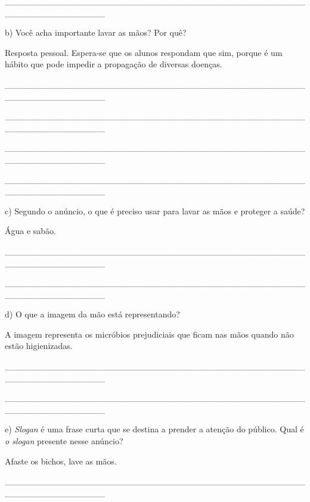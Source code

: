 \begin{boxlist}
{\_\_\_\_\_\_\_\_\_\_\_\_\_\_\_\_\_\_\_\_\_\_\_\_\_\_\_\_\_\_\_\_\_\_\_\_\_\_\_\_\_\_\_\_\_\_\_\_\_\_\_\_\_\_\_\_\_\_\_\_\_\_\_\_

b) Você acha importante lavar as mãos? Por quê?

Resposta pessoal. Espera-se que os alunos respondam que sim, porque é um
hábito que pode impedir a propagação de diversas doenças.

\_\_\_\_\_\_\_\_\_\_\_\_\_\_\_\_\_\_\_\_\_\_\_\_\_\_\_\_\_\_\_\_\_\_\_\_\_\_\_\_\_\_\_\_\_\_\_\_\_\_\_\_\_\_\_\_\_\_\_\_\_\_\_\_

\_\_\_\_\_\_\_\_\_\_\_\_\_\_\_\_\_\_\_\_\_\_\_\_\_\_\_\_\_\_\_\_\_\_\_\_\_\_\_\_\_\_\_\_\_\_\_\_\_\_\_\_\_\_\_\_\_\_\_\_\_\_\_\_

\_\_\_\_\_\_\_\_\_\_\_\_\_\_\_\_\_\_\_\_\_\_\_\_\_\_\_\_\_\_\_\_\_\_\_\_\_\_\_\_\_\_\_\_\_\_\_\_\_\_\_\_\_\_\_\_\_\_\_\_\_\_\_\_

\_\_\_\_\_\_\_\_\_\_\_\_\_\_\_\_\_\_\_\_\_\_\_\_\_\_\_\_\_\_\_\_\_\_\_\_\_\_\_\_\_\_\_\_\_\_\_\_\_\_\_\_\_\_\_\_\_\_\_\_\_\_\_\_

c) Segundo o anúncio, o que é preciso usar para lavar as mãos e proteger a saúde?

Água e sabão.

\_\_\_\_\_\_\_\_\_\_\_\_\_\_\_\_\_\_\_\_\_\_\_\_\_\_\_\_\_\_\_\_\_\_\_\_\_\_\_\_\_\_\_\_\_\_\_\_\_\_\_\_\_\_\_\_\_\_\_\_\_\_\_\_

\_\_\_\_\_\_\_\_\_\_\_\_\_\_\_\_\_\_\_\_\_\_\_\_\_\_\_\_\_\_\_\_\_\_\_\_\_\_\_\_\_\_\_\_\_\_\_\_\_\_\_\_\_\_\_\_\_\_\_\_\_\_\_\_

d) O que a imagem da mão está representando?

A imagem representa os micróbios prejudiciais que ficam nas mãos quando não estão higienizadas.

\_\_\_\_\_\_\_\_\_\_\_\_\_\_\_\_\_\_\_\_\_\_\_\_\_\_\_\_\_\_\_\_\_\_\_\_\_\_\_\_\_\_\_\_\_\_\_\_\_\_\_\_\_\_\_\_\_\_\_\_\_\_\_\_

\_\_\_\_\_\_\_\_\_\_\_\_\_\_\_\_\_\_\_\_\_\_\_\_\_\_\_\_\_\_\_\_\_\_\_\_\_\_\_\_\_\_\_\_\_\_\_\_\_\_\_\_\_\_\_\_\_\_\_\_\_\_\_\_

e) \emph{Slogan} é uma frase curta que se destina a prender a atenção do
público. Qual é \emph{o slogan} presente nesse anúncio?

Afaste os bichos, lave as mãos.

\_\_\_\_\_\_\_\_\_\_\_\_\_\_\_\_\_\_\_\_\_\_\_\_\_\_\_\_\_\_\_\_\_\_\_\_\_\_\_\_\_\_\_\_\_\_\_\_\_\_\_\_\_\_\_\_\_\_\_\_\_\_\_\_

}
\end{boxlist}
